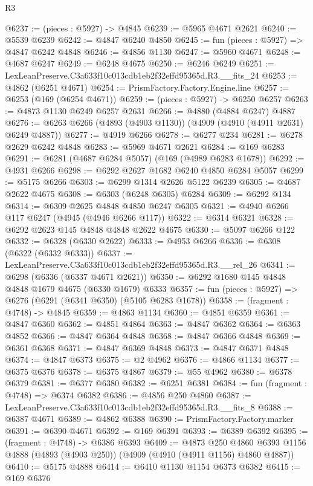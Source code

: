 \begin{lexlean}{R3}
\begin{coremodule}
@6237 := (pieces : @5927) -> @4845
@6239 := @5965 @4671 @2621
@6240 := @5539 @6239
@6242 := @4847 @6240 @4850
@6245 := fun (pieces : @5927) => @4847 @6242 @4848
@6246 := @4856 @1130
@6247 := @5960 @4671
@6248 := @4687 @6247
@6249 := @6248 @4675
@6250 := @6246 @6249
@6251 := LexLeanPreserve.C3a633f10c013cdb1eb2f32effd95365d.R3.__fits_24
@6253 := @4862 (@6251 @4671)
@6254 := PrismFactory.Factory.Engine.line
@6257 := @6253 (@169 (@6254 @4671))
@6259 := (pieces : @5927) -> @6250 @6257
@6263 := @4873 @1130 @6249 @6257 @2631
@6266 := @4880 (@4884 @6247) @4887
@6276 := @6263 @6266 (@4893 (@4903 @1130)) (@4909 (@4910 (@4911 @2631) @6249 @4887))
@6277 := @4919 @6266
@6278 := @6277 @234
@6281 := @6278 @2629 @6242 @4848
@6283 := @5969 @4671 @2621
@6284 := @169 @6283
@6291 := @6281 (@4687 @6284 @5057) (@169 (@4989 @6283 @1678))
@6292 := @4931 @6266
@6298 := @6292 @2627 @1682 @6240 @4850 @6284 @5057
@6299 := @5175 @6266
@6303 := @6299 @1314 @2626 @5122 @6239
@6305 := @4687 @2622 @4675
@6308 := @6303 (@6248 @6305) @6284
@6309 := @6292 @134
@6314 := @6309 @2625 @4848 @4850 @6247 @6305
@6321 := @4940 @6266 @117 @6247 (@4945 (@4946 @6266 @117))
@6322 := @6314 @6321
@6328 := @6292 @2623 @145 @4848 @4848 @2622 @4675
@6330 := @5097 @6266 @122
@6332 := @6328 (@6330 @2622)
@6333 := @4953 @6266
@6336 := @6308 (@6322 (@6332 @6333))
@6337 := LexLeanPreserve.C3a633f10c013cdb1eb2f32effd95365d.R3.__rel_26
@6341 := @6298 (@6336 (@6337 @4671 @2621))
@6350 := @6292 @1680 @145 @4848 @4848 @1679 @4675 (@6330 @1679) @6333
@6357 := fun (pieces : @5927) => @6276 (@6291 (@6341 @6350) (@5105 @6283 @1678))
@6358 := (fragment : @4748) -> @4845
@6359 := @4863 @1134
@6360 := @4851 @6359
@6361 := @4847 @6360
@6362 := @4851 @4864
@6363 := @4847 @6362
@6364 := @6363 @4852
@6366 := @4847 @6364 @4848
@6368 := @4847 @6366 @4848
@6369 := @6361 @6368
@6371 := @4847 @6369 @4848
@6373 := @4847 @6371 @4848
@6374 := @4847 @6373
@6375 := @2 @4962
@6376 := @4866 @1134
@6377 := @6375 @6376
@6378 := @6375 @4867
@6379 := @55 @4962
@6380 := @6378 @6379
@6381 := @6377 @6380
@6382 := @6251 @6381
@6384 := fun (fragment : @4748) => @6374 @6382
@6386 := @4856 @250 @4860
@6387 := LexLeanPreserve.C3a633f10c013cdb1eb2f32effd95365d.R3.__fits_8
@6388 := @6387 @4671
@6389 := @4862 @6388
@6390 := PrismFactory.Factory.marker
@6391 := @6390 @4671
@6392 := @169 @6391
@6393 := @6389 @6392
@6395 := (fragment : @4748) -> @6386 @6393
@6409 := @4873
    @250
    @4860
    @6393
    @1156
    @4888
    (@4893 (@4903 @250))
    (@4909 (@4910 (@4911 @1156) @4860 @4887))
@6410 := @5175 @4888
@6414 := @6410 @1130 @1154 @6373 @6382
@6415 := @169 @6376

\end{coremodule}
\end{lexlean}

